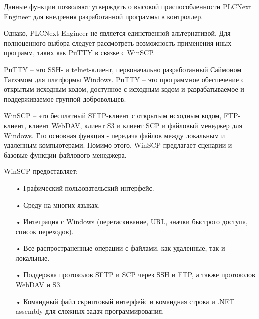 {	\par \redline Данные функции позволяют утверждать о высокой приспособленности PLCNext Engineer для внедрения разработанной программы в контроллер.

	\par \redline Однако, PLCNext Engineer не является единственной альтернативой. Для полноценного выбора следует рассмотреть возможность применения иных программ, таких как PuTTY в связке с WinSCP.

	\par \redline PuTTY {--} это SSH- и telnet-клиент, первоначально разработанный Саймоном Татхэмом для платформы Windows. PuTTY {--} это программное обеспечение с открытым исходным кодом, доступное с исходным кодом и разрабатываемое и поддерживаемое группой добровольцев.

	\par \redline WinSCP {--} это бесплатный SFTP-клиент с открытым исходным кодом, FTP-клиент, клиент WebDAV, клиент S3 и клиент SCP и файловый менеджер для Windows. Его основная функция - передача файлов между локальным и удаленным компьютерами. Помимо этого, WinSCP предлагает сценарии и базовые функции файлового менеджера.

	\par \redline WinSCP предоставляет:

	\begin{itemize}[leftmargin=2.15cm, labelwidth=0.65cm, labelsep=0.0cm] 

		\item[•] 	Графический пользовательский интерфейс.  
		\addtocounter{itemcntr}{1}

		\item[•] Среду на многих языках.
		\addtocounter{itemcntr}{1}

		\item[•] Интеграция с Windows (перетаскивание, URL, значки быстрого доступа, список переходов). 
		\addtocounter{itemcntr}{1}

		\item[•] Все распространенные операции с файлами, как удаленные, так и локальные.  
		\addtocounter{itemcntr}{1}

		\item[•] Поддержка протоколов SFTP и SCP через SSH и FTP, а также протоколов WebDAV и S3. 
		\addtocounter{itemcntr}{1}

		\item[•]  Командный файл скриптовый интерфейс и командная строка и .NET assembly для сложных задач программирования.
		\addtocounter{itemcntr}{1}


\end{itemize}}
